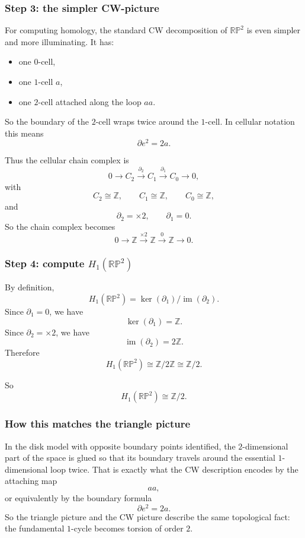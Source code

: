 \documentclass[12pt,a4paper]{article}
\theoremstyle{notespace}
\begin{document}
\subsubsection*{Step 3: the simpler CW-picture}

For computing homology, the standard CW decomposition of \(\mathbb{RP}^2\) is even simpler and more illuminating. It has:

\begin{itemize}
	\item one \(0\)-cell,
	\item one \(1\)-cell \(a\),
	\item one \(2\)-cell attached along the loop \(aa\).
\end{itemize}

So the boundary of the \(2\)-cell wraps twice around the \(1\)-cell. In cellular notation this means
\[
\partial e^2 = 2a.
\]

Thus the cellular chain complex is
\[
0 \longrightarrow C_2 \xrightarrow{\partial_2} C_1 \xrightarrow{\partial_1} C_0 \longrightarrow 0,
\]
with
\[
C_2\cong \mathbb Z,\qquad
C_1\cong \mathbb Z,\qquad
C_0\cong \mathbb Z,
\]
and
\[
\partial_2=\times 2,\qquad \partial_1=0.
\]
So the chain complex becomes
\[
0\longrightarrow \mathbb Z
\xrightarrow{\times 2}
\mathbb Z
\xrightarrow{0}
\mathbb Z
\longrightarrow 0.
\]

\subsubsection*{Step 4: compute \(H_1(\mathbb{RP}^2)\)}

By definition,
\[
H_1(\mathbb{RP}^2)=\ker(\partial_1)/\operatorname{im}(\partial_2).
\]
Since \(\partial_1=0\), we have
\[
\ker(\partial_1)=\mathbb Z.
\]
Since \(\partial_2=\times 2\), we have
\[
\operatorname{im}(\partial_2)=2\mathbb Z.
\]
Therefore
\[
H_1(\mathbb{RP}^2)\cong \mathbb Z/2\mathbb Z \cong \mathbb Z/2.
\]

So
\[
\boxed{H_1(\mathbb{RP}^2)\cong \mathbb Z/2.}
\]

\subsubsection*{How this matches the triangle picture}

In the disk model with opposite boundary points identified, the \(2\)-dimensional part of the space is glued so that its boundary travels around the essential \(1\)-dimensional loop twice. That is exactly what the CW description encodes by the attaching map
\[
aa,
\]
or equivalently by the boundary formula
\[
\partial e^2=2a.
\]
So the triangle picture and the CW picture describe the same topological fact: the fundamental \(1\)-cycle becomes torsion of order \(2\).
\end{document}
